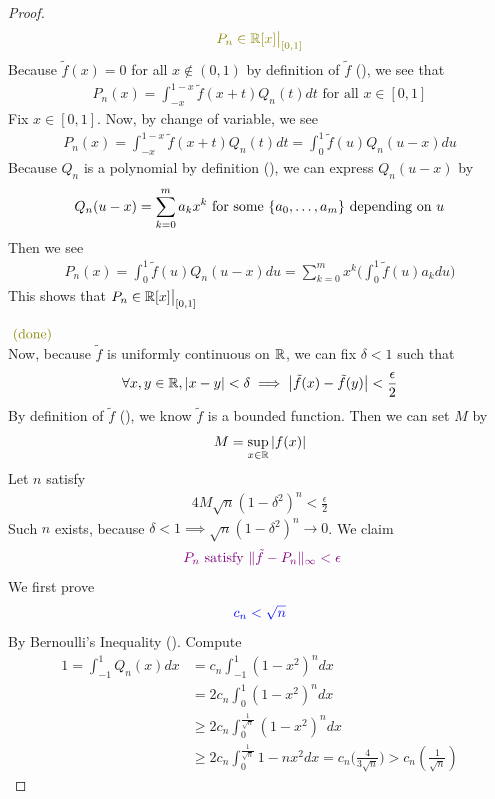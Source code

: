 \documentclass{report}
\begin{document}
\begin{proof}
\begin{align*}
\olive{P_n \in \R[x]\big|_{[0,1]}}
\end{align*}
Because $\tilde{f}(x)=0$ for all $x \not \in (0,1)$ by definition of $\tilde{f} $ (), we see that 
\begin{align}
\label{tse4}
P_n(x)=\int_{-x}^{1-x}\tilde{f}(x+t)Q_n(t)dt \text{ for all }x \in [0,1]
\end{align}
Fix $x \in [0,1]$. Now, by change of variable, we see 
\begin{align*}
P_n(x)=\int_{-x}^{1-x} \tilde{f}(x+t)Q_n(t)dt=\int_{0}^1 \tilde{f}(u)Q_n(u-x)du  
\end{align*}
Because $Q_n$ is a polynomial by definition (), we can express $Q_n(u-x)$ by 
\begin{align*}
Q_n(u-x)=\sum_{k=0}^{m} a_k x^k\text{ for some $\{ a_0,\dots ,a_m \}$ depending on $u$}
\end{align*}
Then we see 
\begin{align*}
  P_n(x)=\int_0^1 \tilde{f}(u)Q_n(u-x)du= \sum_{k=0}^m x^k \Big( 
\int_0^1 \tilde{f}(u) a_kdu
  \Big)  
\end{align*}
This shows that $P_n \in\mathbb{R}[x]\big|_{[0,1]}$

$\odone$\\


Now, because $\tilde{f}$ is uniformly continuous on $\mathbb{R}$, we can fix $\delta<1$ such that 
\begin{align}
\label{tse5}
\forall x,y \in\mathbb{R}, \left|x-y\right|<\delta \implies \left|\tilde{f}(x)-\tilde{f}(y)  \right|<\frac{\epsilon}{2}
\end{align}
By definition of $\tilde{f}$ (), we know $\tilde{f} $ is a bounded function. Then we can set $M$ by 
\begin{align*}
M=\sup_{x \in\mathbb{R}} \left|f(x)\right|
\end{align*}
Let $n$ satisfy 
 \begin{align}
  \label{tse5}
4M \sqrt{n} (1-\delta^2)^n < \frac{\epsilon}{2} 
\end{align}
Such $n$ exists, because  $\delta<1 \implies  \sqrt{n}(1-\delta^2)^n \to 0 $. We claim 
\begin{align*}
\textcolor{violet}{\text{ $P_n$ satisfy $\| \tilde{f}-P_n \|_{\infty}<\epsilon $}}
\end{align*}
We first prove 
\begin{align*}
\textcolor{blue}{c_n< \sqrt{n} }
\end{align*}
By Bernoulli's Inequality (). Compute 
\begin{align*}
1=\int_{-1}^1 Q_n(x)dx&=  c_n\int_{-1}^1 (1-x^2)^n dx \\
&=2c_n\int_0^1 (1-x^2)^n dx\\
&\geq 2c_n\int_0^{\frac{1}{\sqrt{n} }}(1-x^2)^n dx\\
&\geq 2c_n \int_0^{\frac{1}{\sqrt{n} }} 1-nx^2dx=c_n\big(\frac{4}{3\sqrt{n} } \big)> c_n (\frac{1}{\sqrt{n} })
\end{align*}



\end{proof}
\end{document}
